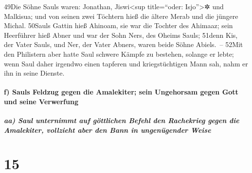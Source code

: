 49Die Söhne Sauls waren: Jonathan, Jiswi\textless sup title=``oder:
Isjo''\textgreater✲ und Malkisua; und von seinen zwei Töchtern hieß die
ältere Merab und die jüngere Michal. 50Sauls Gattin hieß Ahinoam, sie
war die Tochter des Ahimaaz; sein Heerführer hieß Abner und war der Sohn
Ners, des Oheims Sauls; 51denn Kis, der Vater Sauls, und Ner, der Vater
Abners, waren beide Söhne Abiels.~-- 52Mit den Philistern aber hatte
Saul schwere Kämpfe zu bestehen, solange er lebte; wenn Saul daher
irgendwo einen tapferen und kriegstüchtigen Mann sah, nahm er ihn in
seine Dienste.

\hypertarget{f-sauls-feldzug-gegen-die-amalekiter-sein-ungehorsam-gegen-gott-und-seine-verwerfung}{%
\paragraph{f) Sauls Feldzug gegen die Amalekiter; sein Ungehorsam gegen
Gott und seine
Verwerfung}\label{f-sauls-feldzug-gegen-die-amalekiter-sein-ungehorsam-gegen-gott-und-seine-verwerfung}}

\hypertarget{aa-saul-unternimmt-auf-guxf6ttlichen-befehl-den-rachekrieg-gegen-die-amalekiter-vollzieht-aber-den-bann-in-ungenuxfcgender-weise}{%
\subparagraph{aa) Saul unternimmt auf göttlichen Befehl den Rachekrieg
gegen die Amalekiter, vollzieht aber den Bann in ungenügender
Weise}\label{aa-saul-unternimmt-auf-guxf6ttlichen-befehl-den-rachekrieg-gegen-die-amalekiter-vollzieht-aber-den-bann-in-ungenuxfcgender-weise}}

\hypertarget{section-14}{%
\section{15}\label{section-14}}

